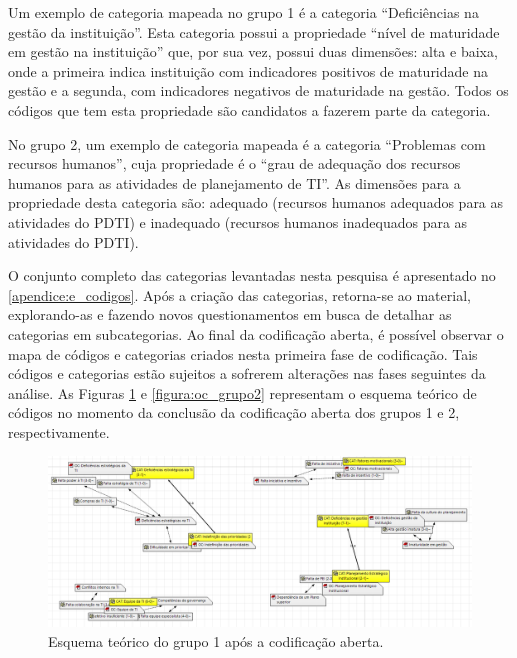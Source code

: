 Um exemplo de categoria mapeada no grupo 1 é a categoria ``Deficiências na gestão da instituição''. Esta categoria possui a propriedade ``nível de maturidade em gestão na instituição'' que, por sua vez, possui duas dimensões: alta e baixa, onde a primeira indica instituição com indicadores positivos de maturidade na gestão e a segunda, com indicadores negativos de maturidade na gestão. Todos os códigos que tem esta propriedade são candidatos a fazerem parte da categoria.

No grupo 2, um exemplo de categoria mapeada é a categoria ``Problemas com recursos humanos'', cuja propriedade é o ``grau de adequação dos recursos humanos para as atividades de planejamento de TI''. As dimensões para a propriedade desta categoria são: adequado (recursos humanos adequados para as atividades do PDTI) e inadequado (recursos humanos inadequados para as atividades do PDTI).

O conjunto completo das categorias levantadas nesta pesquisa é apresentado no \autoref{apendice:e_codigos}. Após a criação das categorias, retorna-se ao material, explorando-as e fazendo novos questionamentos em busca de detalhar as categorias em subcategorias. Ao final da codificação aberta, é possível observar o mapa de códigos e categorias criados nesta primeira fase de codificação. Tais códigos e categorias estão sujeitos a sofrerem alterações nas fases seguintes da análise. As Figuras \ref{figura:oc_grupo1} e \ref{figura:oc_grupo2} representam o esquema teórico de códigos no momento da conclusão da codificação aberta dos grupos 1 e 2, respectivamente.

\begin{figure}[h]
\centering %
\includegraphics[width=16cm, frame]{figuras/oc_grupo1.PNG}
\caption{Esquema teórico do grupo 1 após a codificação aberta.}
\label{figura:oc_grupo1}
\end{figure}

